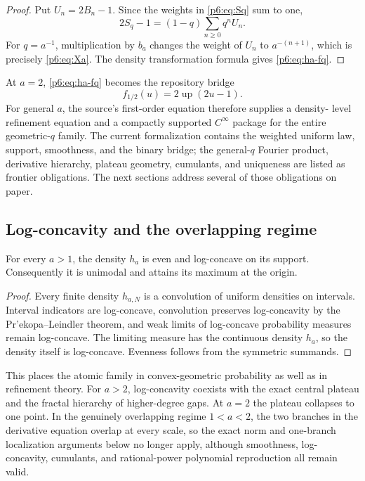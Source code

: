 \documentclass[11pt,oneside]{article}
\numberwithin{equation}{section}
\theoremstyle{definition}
\theoremstyle{remark}
\newcommand{\Up}{\operatorname{up}}
\begin{document}
\begin{proof}
Put $U_n=2B_n-1$.  Since the weights in \eqref{p6:eq:Sq} sum to one,
\[
 2S_q-1=(1-q)\sum_{n\ge0}q^nU_n.
\]
For $q=a^{-1}$, multiplication by $b_a$ changes the weight of $U_n$ to
$a^{-(n+1)}$, which is precisely \eqref{p6:eq:Xa}.  The density transformation
formula gives \eqref{p6:eq:ha-fq}.
\end{proof}

At $a=2$, \eqref{p6:eq:ha-fq} becomes the repository bridge
\[
 f_{1/2}(u)=2\Up(2u-1).
\]
For general $a$, the source's first-order equation therefore supplies a density-
level refinement equation and a compactly supported $C^\infty$ package for the
entire geometric-$q$ family.  The current formalization contains the weighted
uniform law, support, smoothness, and the binary bridge; the general-$q$ Fourier
product, derivative hierarchy, plateau geometry, cumulants, and uniqueness are
listed as frontier obligations.  The next sections address several of those
obligations on paper.

\subsection{Log-concavity and the overlapping regime}

\begin{proposition}\label{p6:prop:log-concavity}
For every $a>1$, the density $h_a$ is even and log-concave on its support.
Consequently it is unimodal and attains its maximum at the origin.
\end{proposition}

\begin{proof}
Every finite density $h_{a,N}$ is a convolution of uniform densities on
intervals.  Interval indicators are log-concave, convolution preserves
log-concavity by the Pr'ekopa--Leindler theorem, and weak limits of log-concave
probability measures remain log-concave.  The limiting measure has the continuous
density $h_a$, so the density itself is log-concave.  Evenness follows from the
symmetric summands.
\end{proof}

This places the atomic family in convex-geometric probability as well as in
refinement theory.  For $a>2$, log-concavity coexists with the exact central
plateau and the fractal hierarchy of higher-degree gaps.  At $a=2$ the plateau
collapses to one point.  In the genuinely overlapping regime $1<a<2$, the two
branches in the derivative equation overlap at every scale, so the exact norm
and one-branch localization arguments below no longer apply, although smoothness,
log-concavity, cumulants, and rational-power polynomial reproduction all remain
valid.
\end{document}
